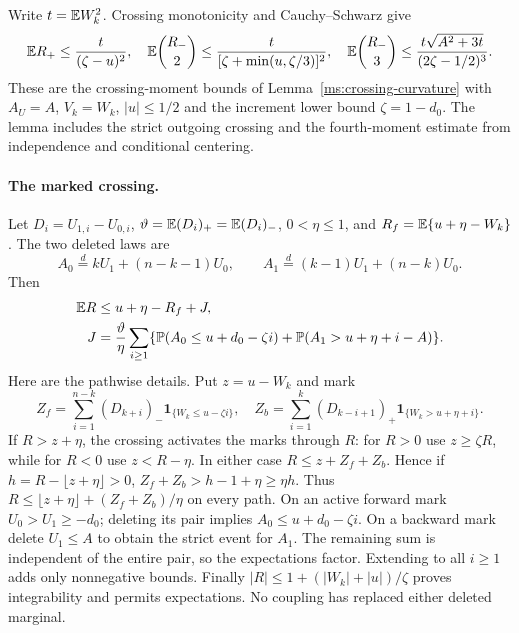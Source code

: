 Write $t=\mathbb E W_k^2$. Crossing monotonicity and Cauchy--Schwarz give
\begin{equation}\label{ms:fourier:cut49:shortloc:crossingmoments}
 \mathbb E R_+\le\frac{t}{(\zeta-u)^2},\quad
 \mathbb E\binom{R_-}{2}\le\frac{t}{[\zeta+\min(u,\zeta/3)]^2},\quad
 \mathbb E\binom{R_-}{3}\le\frac{t\sqrt{A^2+3t}}{(2\zeta-1/2)^3}.
\end{equation}
These are the crossing-moment bounds of Lemma~\ref{ms:crossing-curvature}
with $A_U=A$, $V_k=W_k$, $|u|\le1/2$ and the increment lower bound
$\zeta=1-d_0$. The lemma includes the strict outgoing crossing and the
fourth-moment estimate from independence and conditional centering.

\paragraph{The marked crossing.}
Let $D_i=U_{1,i}-U_{0,i}$, $\vartheta=\mathbb E(D_i)_+=\mathbb E(D_i)_-$,
$0<\eta\le1$, and $R_f=\mathbb E\{u+\eta-W_k\}$. The two deleted laws are
\[
 A_0\overset{d}=kU_1+(n-k-1)U_0,\qquad
 A_1\overset{d}=(k-1)U_1+(n-k)U_0.
\]
Then
\begin{align}
 \mathbb E R&\le u+\eta-R_f+J,\label{ms:fourier:cut49:shortloc:mark}\\
 J&=\frac{\vartheta}{\eta}\sum_{i\ge1}
 \{\mathbb P(A_0\le u+d_0-\zeta i)+\mathbb P(A_1>u+\eta+i-A)\}.\nonumber
\end{align}
Here are the pathwise details. Put $z=u-W_k$ and mark
\[
 Z_f=\sum_{i=1}^{n-k}(D_{k+i})_-\mathbf1_{\{W_k\le u-\zeta i\}},\quad
 Z_b=\sum_{i=1}^{k}(D_{k-i+1})_+\mathbf1_{\{W_k>u+\eta+i\}}.
\]
If $R>z+\eta$, the crossing activates the marks through $R$: for $R>0$
use $z\ge \zeta R$, while for $R<0$ use $z<R-\eta$. In either case
$R\le z+Z_f+Z_b$. Hence if $h=R-\lfloor z+\eta\rfloor>0$,
$Z_f+Z_b>h-1+\eta\ge\eta h$. Thus
$R\le\lfloor z+\eta\rfloor+(Z_f+Z_b)/\eta$ on every path.
On an active forward mark $U_0>U_1\ge-d_0$; deleting its pair implies
$A_0\le u+d_0-\zeta i$. On a backward mark delete $U_1\le A$ to obtain the
strict event for $A_1$. The remaining sum is independent of the entire
pair, so the expectations factor. Extending to all $i\ge1$ adds only
nonnegative bounds. Finally $|R|\le1+(|W_k|+|u|)/\zeta$ proves integrability
and permits expectations. No coupling has replaced either deleted marginal.

